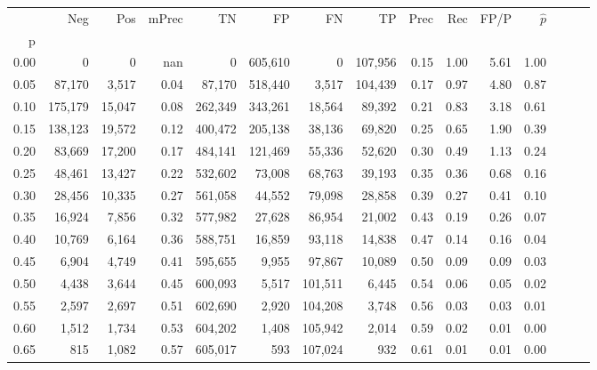 \begin{tabular}{rrrrrrrrrrrrrrr}
\toprule
{} &      Neg &     Pos & mPrec &       TN &       FP &       FN &       TP &  Prec &   Rec &  FP/P & $\hat{p}$ \\
p    &          &         &       &          &          &          &          &       &       &       &           \\
\midrule
0.00 &        0 &       0 &   nan &        0 &  605,610 &        0 &  107,956 &  0.15 &  1.00 &  5.61 &      1.00 \\
0.05 &   87,170 &   3,517 &  0.04 &   87,170 &  518,440 &    3,517 &  104,439 &  0.17 &  0.97 &  4.80 &      0.87 \\
0.10 &  175,179 &  15,047 &  0.08 &  262,349 &  343,261 &   18,564 &   89,392 &  0.21 &  0.83 &  3.18 &      0.61 \\
0.15 &  138,123 &  19,572 &  0.12 &  400,472 &  205,138 &   38,136 &   69,820 &  0.25 &  0.65 &  1.90 &      0.39 \\
0.20 &   83,669 &  17,200 &  0.17 &  484,141 &  121,469 &   55,336 &   52,620 &  0.30 &  0.49 &  1.13 &      0.24 \\
0.25 &   48,461 &  13,427 &  0.22 &  532,602 &   73,008 &   68,763 &   39,193 &  0.35 &  0.36 &  0.68 &      0.16 \\
0.30 &   28,456 &  10,335 &  0.27 &  561,058 &   44,552 &   79,098 &   28,858 &  0.39 &  0.27 &  0.41 &      0.10 \\
0.35 &   16,924 &   7,856 &  0.32 &  577,982 &   27,628 &   86,954 &   21,002 &  0.43 &  0.19 &  0.26 &      0.07 \\
0.40 &   10,769 &   6,164 &  0.36 &  588,751 &   16,859 &   93,118 &   14,838 &  0.47 &  0.14 &  0.16 &      0.04 \\
0.45 &    6,904 &   4,749 &  0.41 &  595,655 &    9,955 &   97,867 &   10,089 &  0.50 &  0.09 &  0.09 &      0.03 \\
0.50 &    4,438 &   3,644 &  0.45 &  600,093 &    5,517 &  101,511 &    6,445 &  0.54 &  0.06 &  0.05 &      0.02 \\
0.55 &    2,597 &   2,697 &  0.51 &  602,690 &    2,920 &  104,208 &    3,748 &  0.56 &  0.03 &  0.03 &      0.01 \\
0.60 &    1,512 &   1,734 &  0.53 &  604,202 &    1,408 &  105,942 &    2,014 &  0.59 &  0.02 &  0.01 &      0.00 \\
0.65 &      815 &   1,082 &  0.57 &  605,017 &      593 &  107,024 &      932 &  0.61 &  0.01 &  0.01 &      0.00 \\

\end{tabular}
